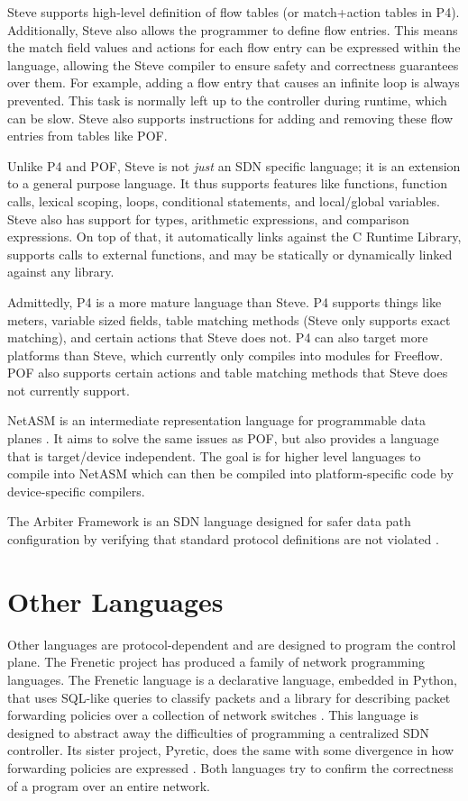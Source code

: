 Steve supports high-level definition of flow tables (or match+action tables in
P4). Additionally, Steve also allows the programmer to define flow entries. This
means the match field values and actions for each flow entry can be expressed
within the language, allowing the Steve compiler to ensure safety and
correctness guarantees over them. For example, adding a flow entry that causes
an infinite loop is always prevented. This task is normally left up to the
controller during runtime, which can be slow. Steve also supports instructions
for adding and removing these flow entries from tables like POF.

Unlike P4 and POF, Steve is not \textit{just} an SDN specific language; it is an
extension to a general purpose language. It thus supports features like
functions, function calls, lexical scoping, loops, conditional statements, and
local/global variables. Steve also has support for types, arithmetic
expressions, and comparison expressions. On top of that, it automatically links
against the C Runtime Library, supports calls to external functions, and may be
statically or dynamically linked against any library.

Admittedly, P4 is a more mature language than Steve. P4 supports things like
meters, variable sized fields, table matching methods (Steve only supports exact
matching), and certain actions that Steve does not. P4 can also target more
platforms than Steve, which currently only compiles into modules for Freeflow.
POF also supports certain actions and table matching methods that Steve does not
currently support.

NetASM is an intermediate representation language for programmable data planes
\cite{shahbaz2015netasm}. It aims to solve the same issues as POF, but also provides a language that is target/device independent. The goal is for higher level languages to compile into NetASM which can then be compiled into platform-specific code by device-specific compilers.

The Arbiter Framework is an SDN language designed for safer data path configuration by verifying that standard protocol definitions are not violated \cite{noproto1}.

\section{Other Languages} \label{rel:frenetic}

Other languages are protocol-dependent and are designed to program the control plane. The Frenetic project has produced a family of network programming
languages. The Frenetic language is a declarative language, embedded in Python,
that uses SQL-like queries to classify packets and a library for describing
packet forwarding policies over a collection of network switches
\cite{foster2011frenetic, foster2013frenetic}. This language is designed to
abstract away the difficulties of programming a centralized SDN controller. Its
sister project, Pyretic, does the same with some divergence in how forwarding
policies are expressed \cite{modularpyretic}. Both languages try to confirm the correctness of a program over an entire network.

